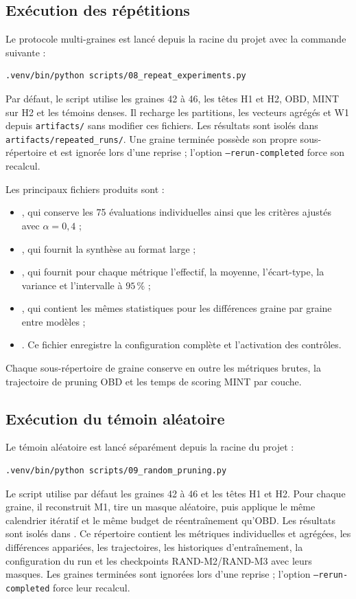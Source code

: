 
\subsection{Exécution des répétitions}

Le protocole multi-graines est lancé depuis la racine du projet avec la
commande suivante :
\begin{verbatim}
.venv/bin/python scripts/08_repeat_experiments.py
\end{verbatim}
Par défaut, le script utilise les graines 42 à 46, les têtes H1 et H2, OBD,
MINT sur H2 et les témoins denses. Il recharge les partitions, les vecteurs
agrégés et W1 depuis \texttt{artifacts/} sans modifier ces fichiers. Les
résultats sont isolés dans \texttt{artifacts/repeated\_runs/}. Une graine
terminée possède son propre sous-répertoire et est ignorée lors d'une reprise ;
l'option \texttt{--rerun-completed} force son recalcul.

Les principaux fichiers produits sont :
\begin{itemize}
    \item {}, qui conserve les 75 évaluations
    individuelles ainsi que les critères ajustés avec $\alpha=0{,}4$ ;
    \item {}, qui fournit la synthèse au format large ;
    \item {}, qui fournit pour chaque métrique
    l'effectif, la moyenne, l'écart-type, la variance et l'intervalle à
    $95\,\%$ ;
    \item {}, qui contient les mêmes
    statistiques pour les différences graine par graine entre modèles ;
    \item {}. Ce fichier enregistre la configuration
    complète et l'activation des contrôles.
\end{itemize}

Chaque sous-répertoire de graine conserve en outre les métriques brutes, la
trajectoire de pruning OBD et les temps de scoring MINT par couche.

\subsection{Exécution du témoin aléatoire}

Le témoin aléatoire est lancé séparément depuis la racine du projet :
\begin{verbatim}
.venv/bin/python scripts/09_random_pruning.py
\end{verbatim}
Le script utilise par défaut les graines 42 à 46 et les têtes H1 et H2. Pour
chaque graine, il reconstruit M1, tire un masque aléatoire, puis applique le
même calendrier itératif et le même budget de réentraînement qu'OBD. Les
résultats sont isolés dans . Ce répertoire
contient les métriques individuelles et agrégées, les différences appariées,
les trajectoires, les historiques d'entraînement, la configuration du run et
les checkpoints RAND-M2/RAND-M3 avec leurs masques. Les graines terminées sont
ignorées lors d'une reprise ; l'option \texttt{--rerun-completed} force leur
recalcul.
